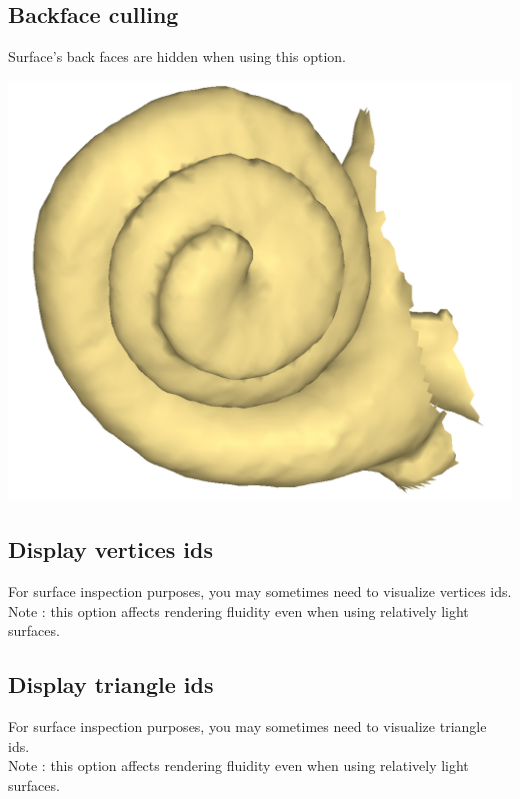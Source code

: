\noindent
\begin{minipage}{0.55\textwidth}

\subsection{Backface culling}
Surface's back faces are hidden when using this option.
\end{minipage}  
 \begin{minipage}{0.45\textwidth}\centering

\includegraphics[scale=0.1]{images/Viewing_options/Backface_culling.png}

 \end{minipage} 
\noindent




\subsection{Display vertices ids}
For surface inspection purposes, you may sometimes need to visualize vertices ids. Note : this option affects rendering fluidity even when using relatively light surfaces.

\subsection{Display triangle ids}
For surface inspection purposes, you may sometimes need to visualize triangle ids.\\
Note : this option affects rendering fluidity even when using relatively light surfaces.\\



